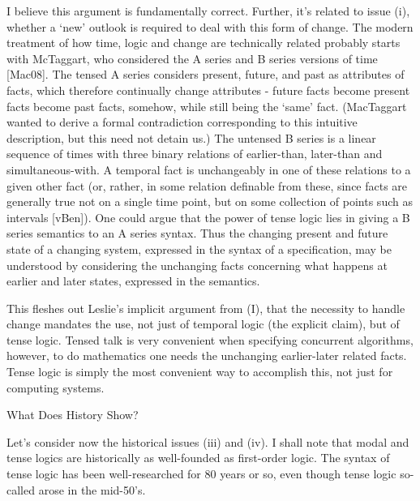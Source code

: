 \begin{spec}
I believe this argument is fundamentally correct.  Further, it's
related to issue (i), whether a `new' outlook is required to deal
with this form of change.  The modern treatment of how time, logic
and change are technically related probably starts with McTaggart,
who considered the A series and B series versions of time [Mac08].
The tensed A series considers present, future, and past as
attributes of facts, which therefore continually change attributes -
future facts become present facts become past facts, somehow, while
still being the `same' fact. (MacTaggart wanted to derive a formal
contradiction corresponding to this intuitive description, but this
need not detain us.)  The untensed B series is a linear sequence of
times with three binary relations of earlier-than, later-than and
simultaneous-with.  A temporal fact is unchangeably in one of these
relations to a given other fact (or, rather, in some relation
definable from these, since facts are generally true not on a single
time point, but on some collection of points such as intervals
[vBen]).  One could argue that the power of tense logic lies in
giving a B series semantics to an A series syntax.  Thus the
changing present and future state of a changing system, expressed
in the syntax of a specification, may be understood by considering
the unchanging facts concerning what happens at earlier and later
states, expressed in the semantics.

This fleshes out Leslie's implicit argument from (I), that the
necessity to handle change mandates the use, not just of temporal
logic (the explicit claim), but of tense logic.  Tensed talk is very
convenient when specifying concurrent algorithms, however, to do
mathematics one needs the unchanging earlier-later related facts.
Tense logic is simply the most convenient way to accomplish this,
not just for computing systems. 

What Does History Show?

Let's consider now the historical issues (iii) and (iv).  I shall
note that modal and tense logics are historically as well-founded 
as first-order logic. The syntax of tense logic has been
well-researched for 80 years or so, even though tense logic
so-called arose in the mid-50's.


\end{spec}

